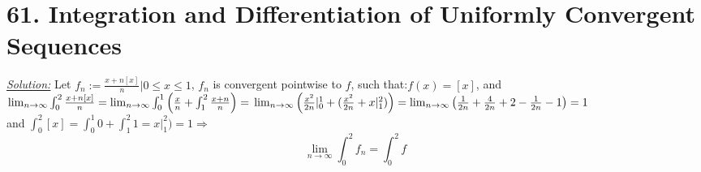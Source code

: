 \documentclass{book}
\begin{document}
\section{61. Integration and Differentiation of Uniformly Convergent
Sequences}
\begin{tcolorbox}[enhanced,attach boxed title to top center={yshift=-3mm,yshifttext=-1mm},
colback=blue!5!white,colframe=blue!75!black,colbacktitle=red!80!black,
title=Exercise 61.1:,fonttitle=\bfseries,
boxed title style={size=small,colframe=red!50!black} ]
\textit{\color{blue}\underline{Solution:}}
Let $f_n:=\frac{x+n[x]}{n}| 0\leq x\leq 1$, $f_n$ is convergent pointwise to $f$, such that:$f(x)=[x]$, and\\
$\lim_{n\to\infty}\int_0^2 \frac{x+n[x]}{n}=\lim_{n\to\infty}\int_0^1
\left(\frac{x}{n}+\int_1^2 \frac{x+n}{n}\right)=\\
\lim_{n\to\infty}\left(\frac{x^2}{2n}|_0^1+(\frac{x^2}{2n}+x|_1^2)\right)=\lim_{n\to\infty}\left(\frac{1}{2n}+\frac{4}{2n}+2-\frac{1}{2n}-1\right)=1$\\
and $\int_0^2 [x]=\int_0^1 0+\int_1^2 1=x|_1^2)=1\Rightarrow$
$$\lim_{n\to\infty}\int_0^2 f_n=\int_0^2 f$$
\end{tcolorbox}
\end{document}
